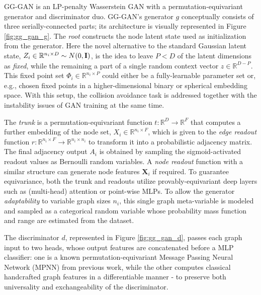 GG-GAN \cite{krawczuk_gg-gan_2020} is an LP-penalty Wasserstein GAN \cite{gulrajani_improved_2017} with a permutation-equivariant generator and discriminator duo. GG-GAN's generator $g$ conceptually consists of three serially-connected parts; its architecture is visually represented in Figure \ref{fig:gg_gan_g}. The \emph{root} constructs the node latent state used as initialization from the generator. Here the novel alternative to the standard Gaussian latent state, $Z_i \in \mathbb{R}^{n_i \times D} \sim N\mathopen{}\left(0,\mathbf{I}\right)$, is the idea to leave $P<D$ of the latent dimensions as \emph{fixed}, while the remaining a part of a single random context vector $z \in \mathbb{R}^{D-P}$. This fixed point set $\Phi_i \in \mathbb{R}^{n_i \times P}$ could either be a fully-learnable parameter set or, e.g., chosen fixed points in a higher-dimensional binary or spherical embedding space. With this setup, the collision avoidance task is addressed together with the instability issues of GAN training at the same time. 

The \emph{trunk} is a permutation-equivariant function $t: \mathbb{R}^D \to \mathbb{R}^{F}$ that computes a further embedding of the node set, $X_i \in \mathbb{R}^{n_i \times F}$, which is given to the \emph{edge readout} function $r: \mathbb{R}^{n_i \times F} \to \mathbb{R}^{n_i \times n_i}$ to transform it into a probabilistic adjacency matrix. The final adjacency output $A_i$ is obtained by sampling the sigmoid-activated readout values as Bernoulli random variables. A \emph{node readout} function with a similar structure can generate node features $\mathbf{X}_i$ if required. To guarantee equivariance, both the trunk and readouts utilize provably-equivariant deep layers such as (multi-head) attention or point-wise MLPs. To allow the generator \emph{adaptability} to variable graph sizes $n_i$, this single graph meta-variable is modeled and sampled as a categorical random variable whose probability mass function and range are estimated from the dataset.

The discriminator $d$, represented in Figure \ref{fig:gg_gan_d}, passes each graph input to two heads, whose output features are concatenated before a MLP classifier: one is a known permutation-equivariant Message Passing Neural Network (MPNN) from previous work, while the other computes classical handcrafted graph features in a differentiable manner - to preserve both universality and exchangeability of the discriminator.

